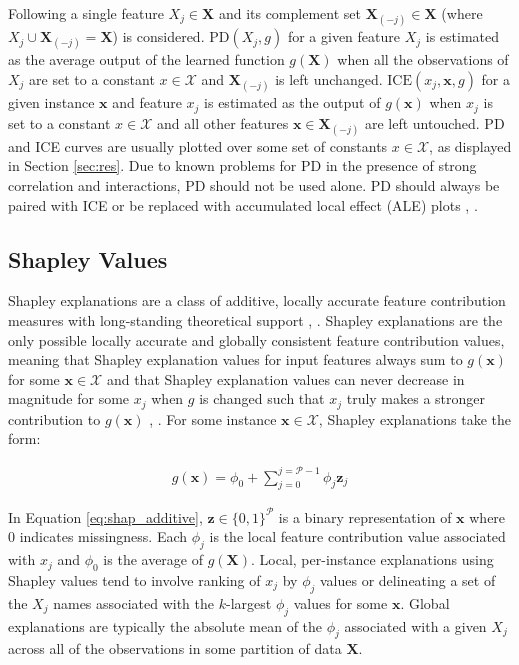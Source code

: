 \documentclass[information,article,submit,moreauthors,pdftex]{definitions/mdpi}
\begin{document}
Following \citet{esl} a single feature $X_j \in \mathbf{X}$ and its complement set $\mathbf{X}_{(-j)} \in \mathbf{X}$ (where $X_j \cup \mathbf{X}_{(-j)} = \mathbf{X}$) is considered. $\text{PD}(X_j, g)$ for a given feature $X_j$ is estimated as the average output of the learned function $g(\mathbf{X})$ when all the observations of $X_j$ are set to a constant $x \in \mathcal{X}$ and $\mathbf{X}_{(-j)}$ is left unchanged. $\text{ICE}(x_j, \mathbf{x}, g)$ for a given instance $\mathbf{x}$ and feature $x_j$ is estimated as the output of $g(\mathbf{x})$ when $x_j$ is set to a constant $x \in \mathcal{X}$ and all other features $\mathbf{x} \in \mathbf{X}_{(-j)}$ are left untouched. PD and ICE curves are usually plotted over some set of constants $x \in \mathcal{X}$, as displayed in Section \ref{sec:res}. Due to known problems for PD in the presence of strong correlation and interactions, PD should not be used alone. PD should always be paired with ICE or be replaced with accumulated local effect (ALE) plots \cite{ice_plots}, \cite{ale_plot}.

\subsection{Shapley Values}\label{ssec:shap}

Shapley explanations are a class of additive, locally accurate feature contribution measures with long-standing theoretical support \cite{shapley}, \cite{shapley1988shapley}. Shapley explanations are the only possible locally accurate and globally consistent feature contribution values, meaning that Shapley explanation values for input features always sum to $g(\mathbf{x})$ for some $\mathbf{x} \in \mathcal{X}$ and that Shapley explanation values can never decrease in magnitude for some $x_j$ when $g$ is changed such that $x_j$ truly makes a stronger contribution to $g(\mathbf{x})$ \cite{shapley}, \cite{tree_shap}. For some instance $\mathbf{x} \in \mathcal{X}$, Shapley explanations take the form: 

\begin{equation}
\label{eq:shap_additive}
\begin{aligned}
g(\mathbf{x}) = \phi_0 + \sum_{j=0}^{j=\mathcal{P} - 1} \phi_j \mathbf{z}_j
\end{aligned}
\end{equation}

\noindent In Equation \ref{eq:shap_additive}, $\mathbf{z} \in \{0,1\}^\mathcal{P}$ is a binary representation of $\mathbf{x}$ where 0 indicates missingness. Each $\phi_j$ is the local feature contribution value associated with $x_j$ and $\phi_0$ is the average of $g(\mathbf{X})$. Local, per-instance explanations using Shapley values tend to involve ranking of $x_j$ by $\phi_j$ values or delineating a set of the $X_j$ names associated with the $k$-largest $\phi_j$ values for some $\mathbf{x}$. Global explanations are typically the absolute mean of the $\phi_j$ associated with a given $X_j$ across all of the observations in some partition of data $\mathbf{X}$. 
\end{document}
